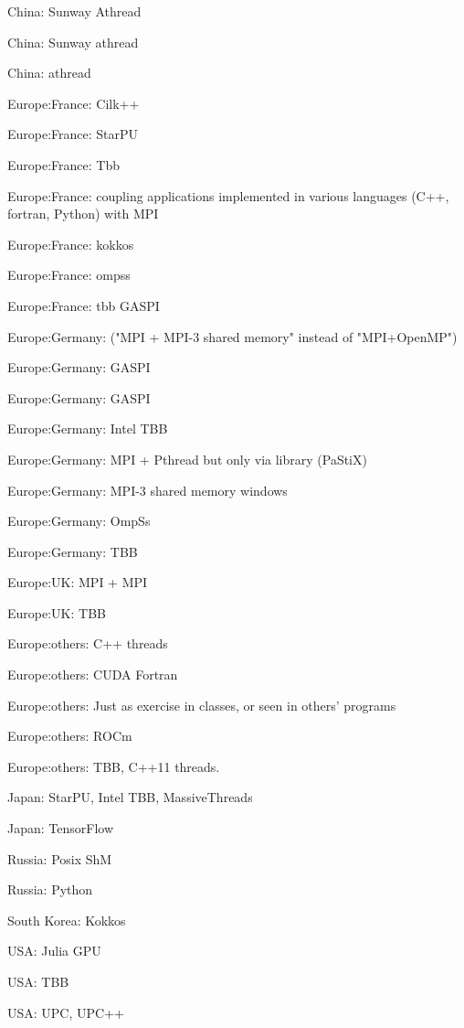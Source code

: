 \item China: Sunway Athread
\item China: Sunway athread
\item China: athread
\item Europe:France: Cilk++
\item Europe:France: StarPU
\item Europe:France: Tbb
\item Europe:France: coupling applications implemented in various languages (C++, fortran, Python) with MPI
\item Europe:France: kokkos
\item Europe:France: ompss
\item Europe:France: tbb GASPI
\item Europe:Germany: ("MPI + MPI-3 shared memory" instead of "MPI+OpenMP")
\item Europe:Germany: GASPI
\item Europe:Germany: GASPI
\item Europe:Germany: Intel TBB
\item Europe:Germany: MPI + Pthread but only via library (PaStiX)
\item Europe:Germany: MPI-3 shared memory windows
\item Europe:Germany: OmpSs
\item Europe:Germany: TBB
\item Europe:UK: MPI + MPI
\item Europe:UK: TBB
\item Europe:others: C++ threads
\item Europe:others: CUDA Fortran
\item Europe:others: Just as exercise in classes, or seen in others' programs
\item Europe:others: ROCm
\item Europe:others: TBB, C++11 threads.
\item Japan: StarPU, Intel TBB, MassiveThreads
\item Japan: TensorFlow
\item Russia: Posix ShM
\item Russia: Python
\item South Korea: Kokkos
\item USA: Julia GPU
\item USA: TBB
\item USA: UPC, UPC++
